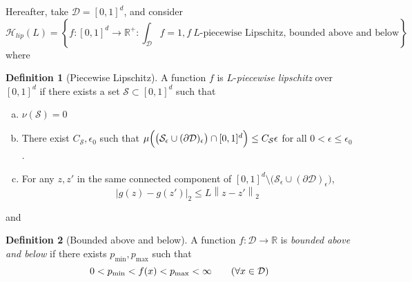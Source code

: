 \documentclass{article}
\newcommand{\Reals}{\mathbb{R}}
\newcommand{\norm}[1]{\left\lVert#1\right\rVert}
\newcommand{\abs}[1]{\left \lvert #1 \right \rvert}
\newcommand{\set}[1]{\left\{#1\right\}}
\newcommand{\1}{\mathbb{I}}
\newcommand{\D}{\mathcal{D}}
\newcommand{\Sset}{\mathcal{S}}
\newcommand{\Hclass}{\mathcal{H}}
\theoremstyle{alden}
\theoremstyle{aldenthm}
\theoremstyle{definition}
\newtheorem{definition}{Definition}[section]
\theoremstyle{remark}
\begin{document}
Hereafter, take $\D = [0,1]^d$, and consider
\begin{equation*}
\Hclass_{lip}(L) = \set{f: [0,1]^d \to \Reals^{+}: \int_{\D}f = 1, f~ \text{$L$-piecewise Lipschitz, bounded above and below} }
\end{equation*}
where
\begin{definition}[Piecewise Lipschitz]
	\label{def: piecewise_lipschitz}
	A function $f$ is $L$-\emph{piecewise lipschitz} over $[0,1]^d$ if there exists a set $\Sset \subset [0,1]^d$ such that
	\begin{enumerate}[(a)]
		\item $\nu(\Sset) = 0$
		\item There exist $C_{\Sset}, \epsilon_0$ such that $\mu \Bigl( \bigl(\Sset_{\epsilon} \cup (\partial \D)_{\epsilon} \bigr) \cap [0,1]^d \Bigr) \leq C_{\Sset} \epsilon$ for all $0 < \epsilon \leq \epsilon_0$.
		\item For any $z, z'$ in the same connected component of $[0,1]^d \setminus \bigl(\Sset_{\epsilon} \cup (\partial \D)_{\epsilon}\bigr)$,
		\begin{equation*}
		\abs{g(z) - g(z')}_2 \leq L\norm{z - z'}_2
		\end{equation*}
	\end{enumerate}
\end{definition}
and
\begin{definition}[Bounded above and below]
	\label{def: bounded}
	A function $f: \D \to \Reals$ is \emph{bounded above and below} if there exists $p_{\min}, p_{\max}$ such that
	\begin{equation*}
	0 < p_{\min} < f(x) < p_{\max} < \infty \tag{$\forall x \in \D$}
	\end{equation*}
\end{definition}
\end{document}
